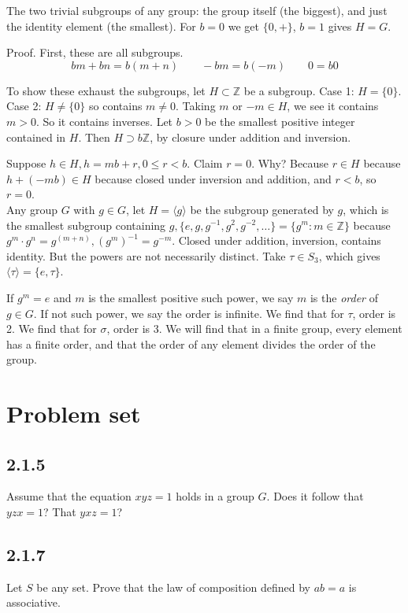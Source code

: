 \documentclass[12pt]{article}
\theoremstyle{definition}
\begin{document}
The two trivial subgroups of any group: the group itself (the biggest), and just the identity element (the smallest).
For \(b=0\) we get \(\{0, +\}\), \(b=1\) gives \(H = G\).

Proof. First, these are all subgroups.
\[bm + bn = b(m+n)\qquad -bm = b(-m)\qquad 0=b0\]

To show these exhaust the subgroups, let \(H \subset \mathbb{Z}\) be a subgroup.
Case 1: \(H = \{0\}\). Case 2: \(H \ne \{0\}\) so contains \(m \ne 0\). Taking \(m\) or \(-m\in H\), we see it contains \(m > 0\).
So it contains inverses. Let \(b > 0\) be the smallest positive integer contained in \(H\). Then \(H\supset b\mathbb{Z}\), by closure under addition and inversion.

Suppose \(h \in H, h = mb + r, 0 \le r < b\). Claim \(r = 0\). Why? Because \(r \in H\) because \(h + (-mb) \in H\) because closed under inversion and addition,
and \(r < b\), so \(r = 0\).
\\
Any group \(G\) with \(g \in G\), let \(H = \langle g\rangle\) be the subgroup generated by \(g\), which is the smallest subgroup
containing \(g, \{e, g, g^{-1}, g^2, g^{-2}, \ldots\} = \{g^m : m \in \mathbb{Z}\}\) because \(g^m\cdot g^n = g^{(m + n)}, (g^m)^{-1}=g^{-m}\).
Closed under addition, inversion, contains identity. But the powers are not necessarily distinct. Take \(\tau\in S_3\), which gives \(\langle \tau\rangle=\{e, \tau\}\).

If \(g^m = e\) and \(m\) is the smallest positive such power, we say \(m\) is the \emph{order} of \(g \in G\). If not such power, we say the order is infinite.
We find that for \(\tau\), order is 2. We find that for \(\sigma\), order is 3. We will find that in a finite group, every element has a finite order, and that the order of any element divides the order of the group.



\section*{Problem set}
\subsection*{2.1.5}
Assume that the equation \(xyz = 1\) holds in a group \(G\). Does it follow that \(yzx = 1\)? That \(yxz = 1\)?
\subsection*{2.1.7}
Let \(S\) be any set. Prove that the law of composition defined by \(ab = a\) is associative.
\end{document}
